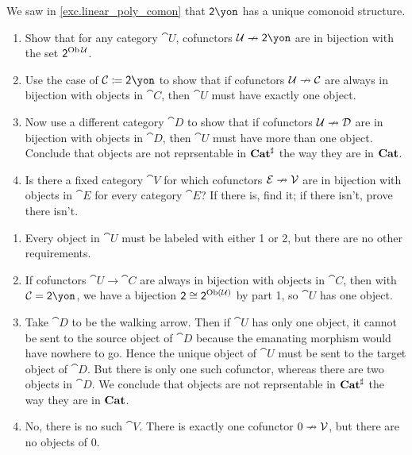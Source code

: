 \documentclass[Book-Poly]{subfiles}
\begin{document}
\begin{exercise}\label{exc.rep_objects}
We saw in \cref{exc.linear_poly_comon} that $\2\yon$ has a unique comonoid structure.
\begin{enumerate}
	\item Show that for any category $\cat{U}$, cofunctors $\cat{U}\cof\2\yon$ are in bijection with the set $\textsf{2}^{\operatorname{Ob}\mathcal{U}}$.
	\item Use the case of $\cat{C}\coloneqq\2\yon$ to show that if cofunctors $\mathcal{U}\nrightarrow\mathcal{C}$ are always in bijection with objects in $\cat{C}$, then $\cat{U}$ must have exactly one object.
	\item Now use a different category $\cat{D}$ to show that if cofunctors $\mathcal{U}\nrightarrow\mathcal{D}$ are in bijection with objects in $\cat{D}$, then $\cat{U}$ must have more than one object.
	Conclude that objects are not reprsentable in $\mathbf{Cat}^\sharp$ the way they are in $\mathbf{Cat}$.
	\item Is there a fixed category $\cat{V}$ for which cofunctors $\mathcal{E}\nrightarrow\mathcal{V}$ are in bijection with objects in $\cat{E}$ for every category $\cat{E}$?
	If there is, find it; if there isn't, prove there isn't.
\qedhere
\end{enumerate}
\begin{solution}
\begin{enumerate}
    \item Every object in $\cat{U}$ must be labeled with either 1 or 2, but there are no other requirements.
    \item If cofunctors $\cat{U}\to\cat{C}$ are always in bijection with objects in $\cat{C}$, then with $\cat{C}=\2\yon$, we have a bijection $\textsf{2}\cong\textsf{2}^{\operatorname{Ob}(\mathcal{U})}$ by part 1, so $\cat{U}$ has one object.
    \item Take $\cat{D}$ to be the walking arrow. Then if $\cat{U}$ has only one object, it cannot be sent to the source object of $\cat{D}$ because the emanating morphism would have nowhere to go. Hence the unique object of $\cat{U}$ must be sent to the target object of $\cat{D}$. But there is only one such cofunctor, whereas there are two objects in $\cat{D}$. We conclude that objects are not reprsentable in $\mathbf{Cat}^\sharp$ the way they are in $\mathbf{Cat}$.
    \item No, there is no such $\cat{V}$. There is exactly one cofunctor $0\nrightarrow\mathcal{V}$, but there are no objects of $0$.
\end{enumerate}
\end{solution}
\end{exercise}
\end{document}

